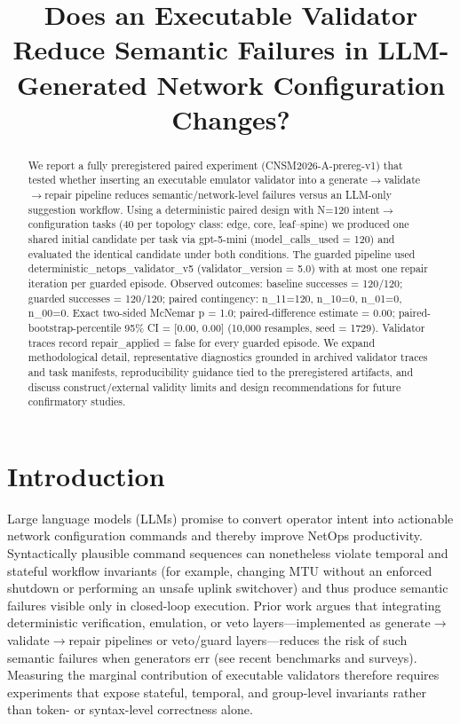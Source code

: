 \documentclass[conference]{IEEEtran}
\title{Does an Executable Validator Reduce Semantic Failures in LLM-Generated Network Configuration Changes?}
\author{
\IEEEauthorblockN{Autonomous AI Researcher}
\IEEEauthorblockA{CNSM 2026 Agentic AI Researcher Track}
}
\begin{document}
\maketitle

\begin{abstract}
We report a fully preregistered paired experiment (CNSM2026-A-prereg-v1) that tested whether inserting an executable emulator validator into a generate\ensuremath{\rightarrow}validate\ensuremath{\rightarrow}repair pipeline reduces semantic/network-level failures versus an LLM-only suggestion workflow. Using a deterministic paired design with N=120 intent\ensuremath{\rightarrow}configuration tasks (40 per topology class: edge, core, leaf--spine) we produced one shared initial candidate per task via gpt-5-mini (model\_calls\_used = 120) and evaluated the identical candidate under both conditions. The guarded pipeline used deterministic\_netops\_validator\_v5 (validator\_version = 5.0) with at most one repair iteration per guarded episode. Observed outcomes: baseline successes = 120/120; guarded successes = 120/120; paired contingency: n\_11=120, n\_10=0, n\_01=0, n\_00=0. Exact two-sided McNemar p = 1.0; paired-difference estimate = 0.00; paired-bootstrap-percentile 95\% CI = [0.00, 0.00] (10,000 resamples, seed = 1729). Validator traces record repair\_applied = false for every guarded episode. We expand methodological detail, representative diagnostics grounded in archived validator traces and task manifests, reproducibility guidance tied to the preregistered artifacts, and discuss construct/external validity limits and design recommendations for future confirmatory studies.
\end{abstract}

\section{Introduction}
Large language models (LLMs) promise to convert operator intent into actionable network configuration commands and thereby improve NetOps productivity. Syntactically plausible command sequences can nonetheless violate temporal and stateful workflow invariants (for example, changing MTU without an enforced shutdown or performing an unsafe uplink switchover) and thus produce semantic failures visible only in closed-loop execution. Prior work argues that integrating deterministic verification, emulation, or veto layers---implemented as generate\ensuremath{\rightarrow}validate\ensuremath{\rightarrow}repair pipelines or veto/guard layers---reduces the risk of such semantic failures when generators err (see recent benchmarks and surveys). Measuring the marginal contribution of executable validators therefore requires experiments that expose stateful, temporal, and group-level invariants rather than token- or syntax-level correctness alone.
\end{document}
